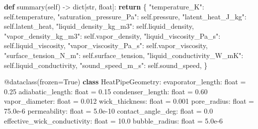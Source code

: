 \documentclass[
  12pt,
  12pt,a4paper,oneside]{report}
\newenvironment{Shaded}{}{}
\newcommand{\AttributeTok}[1]{\textcolor[rgb]{0.49,0.56,0.16}{#1}}
\newcommand{\BuiltInTok}[1]{\textcolor[rgb]{0.00,0.50,0.00}{#1}}
\newcommand{\ControlFlowTok}[1]{\textcolor[rgb]{0.00,0.44,0.13}{\textbf{#1}}}
\newcommand{\FloatTok}[1]{\textcolor[rgb]{0.25,0.63,0.44}{#1}}
\newcommand{\KeywordTok}[1]{\textcolor[rgb]{0.00,0.44,0.13}{\textbf{#1}}}
\newcommand{\NormalTok}[1]{#1}
\newcommand{\OperatorTok}[1]{\textcolor[rgb]{0.40,0.40,0.40}{#1}}
\newcommand{\StringTok}[1]{\textcolor[rgb]{0.25,0.44,0.63}{#1}}
\newcommand{\VariableTok}[1]{\textcolor[rgb]{0.10,0.09,0.49}{#1}}
\begin{document}
\begin{Shaded}
\begin{Highlighting}[]
    \KeywordTok{def}\NormalTok{ summary(}\VariableTok{self}\NormalTok{) }\OperatorTok{{-}\textgreater{}} \BuiltInTok{dict}\NormalTok{[}\BuiltInTok{str}\NormalTok{, }\BuiltInTok{float}\NormalTok{]:}
        \ControlFlowTok{return}\NormalTok{ \{}
            \StringTok{"temperature\_K"}\NormalTok{: }\VariableTok{self}\NormalTok{.temperature,}
            \StringTok{"saturation\_pressure\_Pa"}\NormalTok{: }\VariableTok{self}\NormalTok{.pressure,}
            \StringTok{"latent\_heat\_J\_kg"}\NormalTok{: }\VariableTok{self}\NormalTok{.latent\_heat,}
            \StringTok{"liquid\_density\_kg\_m3"}\NormalTok{: }\VariableTok{self}\NormalTok{.liquid\_density,}
            \StringTok{"vapor\_density\_kg\_m3"}\NormalTok{: }\VariableTok{self}\NormalTok{.vapor\_density,}
            \StringTok{"liquid\_viscosity\_Pa\_s"}\NormalTok{: }\VariableTok{self}\NormalTok{.liquid\_viscosity,}
            \StringTok{"vapor\_viscosity\_Pa\_s"}\NormalTok{: }\VariableTok{self}\NormalTok{.vapor\_viscosity,}
            \StringTok{"surface\_tension\_N\_m"}\NormalTok{: }\VariableTok{self}\NormalTok{.surface\_tension,}
            \StringTok{"liquid\_conductivity\_W\_mK"}\NormalTok{: }\VariableTok{self}\NormalTok{.liquid\_conductivity,}
            \StringTok{"sound\_speed\_m\_s"}\NormalTok{: }\VariableTok{self}\NormalTok{.sound\_speed,}
\NormalTok{        \}}


\AttributeTok{@dataclass}\NormalTok{(frozen}\OperatorTok{=}\VariableTok{True}\NormalTok{)}
\KeywordTok{class}\NormalTok{ HeatPipeGeometry:}
\NormalTok{    evaporator\_length: }\BuiltInTok{float} \OperatorTok{=} \FloatTok{0.25}
\NormalTok{    adiabatic\_length: }\BuiltInTok{float} \OperatorTok{=} \FloatTok{0.15}
\NormalTok{    condenser\_length: }\BuiltInTok{float} \OperatorTok{=} \FloatTok{0.60}
\NormalTok{    vapor\_diameter: }\BuiltInTok{float} \OperatorTok{=} \FloatTok{0.012}
\NormalTok{    wick\_thickness: }\BuiltInTok{float} \OperatorTok{=} \FloatTok{0.001}
\NormalTok{    pore\_radius: }\BuiltInTok{float} \OperatorTok{=} \FloatTok{75.0e{-}6}
\NormalTok{    permeability: }\BuiltInTok{float} \OperatorTok{=} \FloatTok{5.0e{-}10}
\NormalTok{    contact\_angle\_deg: }\BuiltInTok{float} \OperatorTok{=} \FloatTok{0.0}
\NormalTok{    effective\_wick\_conductivity: }\BuiltInTok{float} \OperatorTok{=} \FloatTok{10.0}
\NormalTok{    bubble\_radius: }\BuiltInTok{float} \OperatorTok{=} \FloatTok{5.0e{-}6}


\end{Highlighting}
\end{Shaded}
\end{document}
